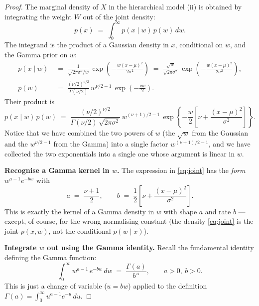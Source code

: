 \documentclass[11pt, a4paper, oneside]{article}
\begin{document}
\begin{proof}
The marginal density of $X$ in the hierarchical model (ii) is obtained by
integrating the weight $W$ out of the joint density:
\begin{equation}
p(x) \;=\; \int_0^{\infty} p(x \mid w)\, p(w)\, dw.
\label{eq:marginalisation}
\end{equation}
The integrand is the product of a Gaussian density in $x$, conditional on
$w$, and the Gamma prior on $w$:
\begin{align*}
p(x \mid w) &\;=\; \frac{1}{\sqrt{2\pi\sigma^{2}/w}}\,
\exp\!\left(-\frac{w(x-\mu)^{2}}{2\sigma^{2}}\right)
\;=\; \frac{\sqrt{w}}{\sqrt{2\pi\sigma^{2}}}\,
\exp\!\left(-\frac{w(x-\mu)^{2}}{2\sigma^{2}}\right), \\[6pt]
p(w) &\;=\; \frac{(\nu/2)^{\nu/2}}{\Gamma(\nu/2)}\,
w^{\nu/2 - 1}\, \exp\!\left(-\frac{\nu w}{2}\right).
\end{align*}
Their product is
\begin{equation}
p(x \mid w)\, p(w)
\;=\;
\frac{(\nu/2)^{\nu/2}}{\Gamma(\nu/2)\,\sqrt{2\pi\sigma^{2}}}\,
w^{(\nu+1)/2 - 1}\,
\exp\!\left\{-\frac{w}{2}\!\left[\nu + \frac{(x-\mu)^{2}}{\sigma^{2}}\right]\right\}.
\label{eq:joint}
\end{equation}
Notice that we have combined the two powers of $w$
(the $\sqrt{w}$ from the Gaussian and the $w^{\nu/2 - 1}$ from the Gamma)
into a single factor $w^{(\nu+1)/2 - 1}$, and we have collected the two
exponentials into a single one whose argument is linear in $w$.

\medskip

\noindent\textbf{Recognise a Gamma kernel in $w$.}
The expression in \eqref{eq:joint} has the \emph{form}
$w^{a-1} e^{-b w}$ with
\[
a \;=\; \frac{\nu + 1}{2},
\qquad
b \;=\; \frac{1}{2}\!\left[\nu + \frac{(x-\mu)^{2}}{\sigma^{2}}\right].
\]
This is exactly the kernel of a Gamma density in $w$ with shape $a$ and
rate $b$ — except, of course, for the wrong normalising constant (the
density \eqref{eq:joint} is the joint $p(x,w)$, not the conditional
$p(w \mid x)$).

\medskip

\noindent\textbf{Integrate $w$ out using the Gamma identity.}
Recall the fundamental identity defining the Gamma function:
\begin{equation}
\int_0^{\infty} w^{a - 1}\, e^{- b w}\, dw \;=\; \frac{\Gamma(a)}{b^{\,a}},
\qquad a > 0,\ b > 0.
\label{eq:gamma-identity}
\end{equation}
This is just a change of variable ($u = bw$) applied to the definition
$\Gamma(a) = \int_0^\infty u^{a-1} e^{-u}\,du$.


\end{proof}
\end{document}
